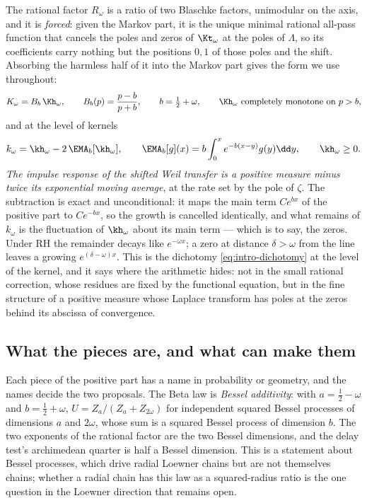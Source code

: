 The rational factor $R_\omega$ is a ratio of two Blaschke factors, unimodular
on the axis, and it is \emph{forced}: given the Markov part, it is the unique
minimal rational all-pass function that cancels the poles and zeros of
$\Kt_\omega$ at the poles of $\Lambda$, so its coefficients carry nothing but
the positions $0,1$ of those poles and the shift. Absorbing the harmless half
of it into the Markov part gives the form we use throughout:
\begin{equation}\label{eq:intro-decomp}
 K_\omega=B_b\,\Kh_\omega,\qquad B_b(p)=\frac{p-b}{p+b},\qquad b=\tfrac12+\omega,
 \qquad \Kh_\omega\ \text{completely monotone on }p>b,
\end{equation}
and at the level of kernels
\begin{equation}\label{eq:intro-ema}
 k_\omega=\kh_\omega-2\,\EMA_b[\kh_\omega],\qquad
 \EMA_b[g](x)=b\int_0^xe^{-b(x-y)}g(y)\dd y,\qquad \kh_\omega\geq0 .
\end{equation}
\emph{The impulse response of the shifted Weil transfer is a positive measure
minus twice its exponential moving average}, at the rate set by the pole of
$\zeta$. The subtraction is exact and unconditional: it maps the main term
$Ce^{bx}$ of the positive part to $Ce^{-bx}$, so the growth is cancelled
identically, and what remains of $k_\omega$ is the fluctuation of $\kh_\omega$
about its main term --- which is to say, the zeros. Under RH the remainder
decays like $e^{-\omega x}$; a zero at distance $\delta>\omega$ from the line
leaves a growing $e^{(\delta-\omega)x}$. This is the dichotomy
\eqref{eq:intro-dichotomy} at the level of the kernel, and it says where the
arithmetic hides: not in the small rational correction, whose residues are
fixed by the functional equation, but in the fine structure of a positive
measure whose Laplace transform has poles at the zeros behind its abscissa of
convergence.

\subsection{What the pieces are, and what can make them}

Each piece of the positive part has a name in probability or geometry, and the
names decide the two proposals. The Beta law is \emph{Bessel additivity}: with
$a=\frac12-\omega$ and $b=\frac12+\omega$, $U=Z_a/(Z_a+Z_{2\omega})$ for
independent squared Bessel processes of dimensions $a$ and $2\omega$, whose sum
is a squared Bessel process of dimension $b$. The two exponents of the rational
factor are the two Bessel dimensions, and the delay test's archimedean quarter
is half a Bessel dimension. This is a statement about Bessel processes, which
drive radial Loewner chains but are not themselves chains; whether a radial
chain has this law as a squared-radius ratio is the one question in the Loewner
direction that remains open.

